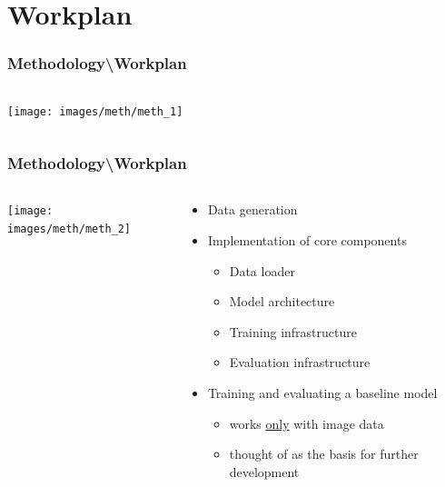 \documentclass[18pt]{beamer}
\begin{document}
\section{Workplan}
\begin{frame}[t]
  \frametitle{Methodology\textbackslash Workplan}
  \begin{columns}[t]
    \begin{column}{0.35\textwidth}
      \texttt{[image: images/meth/meth\_1]}
    \end{column}
    \begin{column}[t]{0.65\textwidth}
      \vspace*{-7cm}
    \end{column}
  \end{columns}
\end{frame}


\begin{frame}[t]
  \frametitle{Methodology\textbackslash Workplan}
  \begin{columns}[t]
    \begin{column}{0.35\textwidth}
      \texttt{[image: images/meth/meth\_2]}
    \end{column}
    \begin{column}[t]{0.65\textwidth}
      \vspace*{-7cm}
      \begin{itemize}
      \item Data generation
      \item Implementation of core components
        \begin{itemize}
        \item Data loader
        \item Model architecture
        \item Training infrastructure
        \item Evaluation infrastructure
        \end{itemize}
      \item Training and evaluating a baseline model
        \begin{itemize}
        \item works \underline{only} with image data
        \item thought of as the basis for further development
        \end{itemize}
      \end{itemize}
    \end{column}
  \end{columns}
\end{frame}
\end{document}
